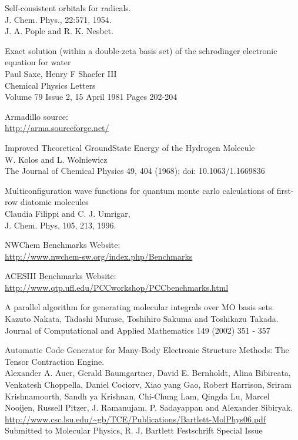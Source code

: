 \documentclass[a4paper,norsk,11pt,twoside]{report}
\begin{document}
\begin{thebibliography}{}
Self-consistent orbitals for radicals. \\
J. Chem. Phys., 22:571, 1954. \\
J. A. Pople and R. K. Nesbet.

Exact solution (within a double-zeta basis set) of the schrodinger electronic equation for water \\
Paul Saxe, Henry F Shaefer III \\
Chemical Physics Letters \\
Volume 79 Issue 2, 15 April 1981 Pages 202-204 

Armadillo source: \\
\url{http://arma.sourceforge.net/}

Improved Theoretical GroundState Energy of the Hydrogen Molecule \\
W. Kolos and L. Wolniewicz \\
The Journal of Chemical Physics 49, 404 (1968); doi: 10.1063/1.1669836

Multiconfiguration wave functions for quantum monte carlo calculations of first-row diatomic molecules \\
Claudia Filippi and C. J. Umrigar, \\
J. Chem. Phys, 105, 213, 1996. 

NWChem Benchmarks Website: \\
\url{http://www.nwchem-sw.org/index.php/Benchmarks}

ACESIII Benchmarks Website: \\
\url{http://www.qtp.ufl.edu/PCCworkshop/PCCbenchmarks.html}

A parallel algorithm for generating molecular integrals over MO basis sets. \\
Kazuto Nakata, Tadashi Murase, Toshihiro Sakuma and Toshikazu Takada. \\
Journal of Computational and Applied Mathematics 149 (2002) 351 - 357

Automatic Code Generator for Many-Body Electronic Structure Methods: The Tensor Contraction Engine. \\
Alexander A. Auer, Gerald Baumgartner, David E. Bernholdt, Alina Bibireata, Venkatesh Choppella, Daniel Cociorv, Xiao yang Gao, Robert Harrison, Sriram Krishnamoorth, Sandh ya Krishnan, Chi-Chung Lam, Qingda Lu, Marcel Nooijen, Russell Pitzer, J. Ramanujam, P. Sadayappan and Alexander Sibiryak. \\
\url{http://www.csc.lsu.edu/~gb/TCE/Publications/Bartlett-MolPhys06.pdf} \\
Submitted to Molecular Physics, R. J. Bartlett Festschrift Special Issue


\end{thebibliography}
\end{document}
